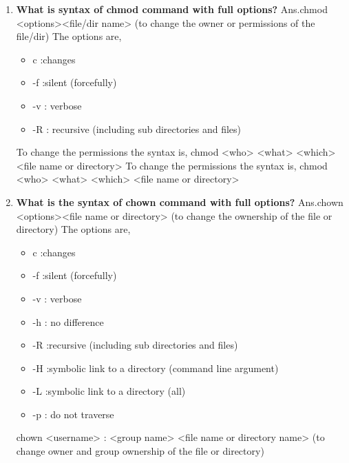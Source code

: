 \begin{enumerate}
    \bigskip
    \bigskip

    \item \textbf{What is syntax of chmod command with full options?}
    \newline
    Ans.chmod   <options><file/dir  name>  (to change the owner or permissions of the file/dir)	
    The options are,\begin{itemize}
                         \item c :changes
                         \item	-f :silent  (forcefully)
                         \item	-v  : verbose
                         \item	-R  : recursive (including sub directories and files)
                    \end{itemize} 
    To change the permissions the syntax is,
    chmod  <who>	<what>	<which>		<file name or directory>
    To change the permissions the syntax is,
    chmod  <who>	<what>	<which>		<file name or directory>

    \bigskip
    \bigskip

    \item \textbf{What is the syntax of chown command with full options?}
    \newline
    Ans.chown    <options><file name  or   directory>	(to change the ownership of the file or directory)
    The options are,\begin{itemize}
                       \item c :changes
                       \item-f :silent  (forcefully)
                       \item-v  : verbose
                       \item -h  : no difference
                       \item -R  :recursive  (including sub directories and files)
                       \item -H  :symbolic link to a directory   (command line argument)
                       \item -L  :symbolic link to a directory   (all)
                       \item -p  : do not traverse
                    \end{itemize}
    chown   <username>  :   <group name>	<file name   or   directory name>   (to change owner and group  ownership of the file  or  directory)


\end{enumerate}
